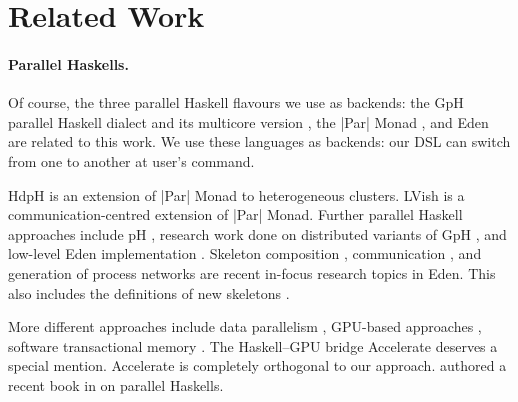 \section{Related Work}
\label{sec:related-work}

\paragraph{Parallel Haskells.}
Of course, the three parallel Haskell flavours we use as backends: the GpH \cite{Trinder1996,Trinder1998a} parallel Haskell dialect and its multicore version \cite{Marlow2009}, the |Par| Monad \cite{par-monad,Foltzer:2012:MPC:2398856.2364562}, and Eden \cite{eden,Loogen2012} are related to this work. We use these languages as backends: our DSL can switch from one to another at user's command.

HdpH \cite{Maier:2014:HDS:2775050.2633363,stewart_maier_trinder_2016} is an extension of |Par| Monad to heterogeneous clusters. LVish \cite{Kuper:2014:TPE:2666356.2594312} is a communication-centred extension of |Par| Monad.
%
Further parallel Haskell approaches include pH \cite{ph-book}, research work done on distributed variants of GpH \cite{Trinder1996,Aljabri:2013:DIG:2620678.2620682,Aljabri2015}, and low-level Eden implementation \cite{JostThesis,berthold_loidl_hammond_2016}. Skeleton composition \cite{dieterle_horstmeyer_loogen_berthold_2016}, communication \cite{Dieterle2010}, and generation of process networks \cite{Horstmeyer2013} are recent in-focus research topics in Eden. This also includes the definitions of new skeletons \cite{doi:10.1142/S0129626403001380,Eden:PARCO05,Berthold2009-mr,Berthold2009-fft,dieterle2010skeleton,delaEncina2011,Dieterle2013,janjic2013space}.

More different approaches include data parallelism \cite{Chakravarty2007,Keller:2010:RSP:1932681.1863582}, GPU-based approaches \cite{Mainland:2010:NEC:2088456.1863533,obsidian-phd}, software transactional memory \cite{Harris:2005:CMT:1065944.1065952,Perfumo:2008:LST:1366230.1366241}.
%
The Haskell--GPU bridge Accelerate \cite{Chakravarty:2011:AHA:1926354.1926358,CMCK14,McDonell:2015:TRC:2887747.2804313} deserves a special mention. Accelerate is completely orthogonal to our approach. \citeauthor{marlow2013parallel} authored a recent book in \citeyear{marlow2013parallel} on parallel Haskells.

